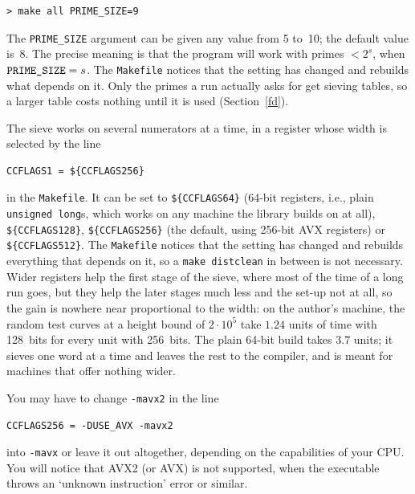 \documentclass[12pt,a4paper,oneside]{amsart}
\begin{document}
\begin{verbatim}
> make all PRIME_SIZE=9
\end{verbatim}

The \texttt{PRIME\_SIZE} argument can be given any value from 5 to~10;
the default value is~8. The precise meaning is that the program will
work with primes $< 2^s$, when $\text{\texttt{PRIME\_SIZE}} = s$. The
\texttt{Makefile} notices that the setting has changed and rebuilds what
depends on it. Only the primes a run actually asks for get sieving tables,
so a larger table costs nothing until it is used (Section~\ref{fd}).

The sieve works on several numerators at a time, in a register whose width is
selected by the line
\begin{verbatim}
CCFLAGS1 = ${CCFLAGS256}
\end{verbatim}
in the \texttt{Makefile}. It can be set to \verb+${CCFLAGS64}+ (64-bit
registers, i.e., plain \texttt{unsigned long}s, which works on any machine
the library builds on at all), \verb+${CCFLAGS128}+,
\verb+${CCFLAGS256}+ (the default, using 256-bit AVX registers) or
\verb+${CCFLAGS512}+. The \texttt{Makefile} notices that the setting has
changed and rebuilds everything that depends on it, so a \texttt{make
distclean} in between is not necessary. Wider
registers help the first stage of the sieve, where most of the time of a
long run goes, but they help the later stages much less and the set-up not
at all, so the gain is nowhere near proportional to the width: on the
author's machine, the random test curves at a height bound of $2\cdot10^5$
take $1.24$ units of time with 128~bits for every unit with 256~bits. The
plain 64-bit build takes $3.7$ units; it sieves one word at a time and leaves
the rest to the compiler, and is meant for machines that offer nothing
wider.


You may have to change \verb+-mavx2+ in the line
\begin{verbatim}
CCFLAGS256 = -DUSE_AVX -mavx2
\end{verbatim}
into \verb+-mavx+ or leave it out altogether, depending on the capabilities
of your CPU. You will notice that AVX2 (or AVX) is not supported, when the
executable throws an `unknown instruction' error or similar.
\end{document}
